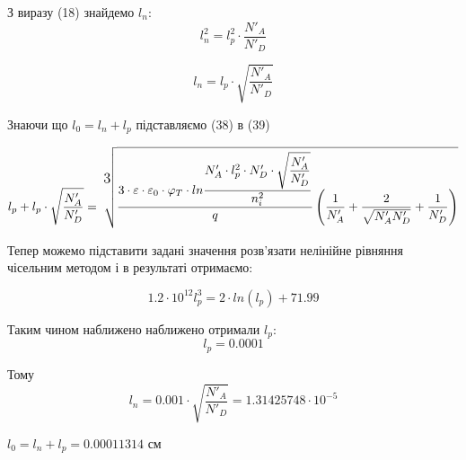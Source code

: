 \documentclass[14pt,a4paper]{scrartcl}
\begin{document}
З виразу (18) знайдемо $l_n$:
\begin{equation}
l^2_n=l^2_p\cdot\dfrac{N'_A}{N'_D}
\end{equation}

\begin{equation}
l_n=l_p\cdot\sqrt{\dfrac{N'_A}{N'_D}}
\end{equation}

Знаючи що $l_0=l_n+l_p$ підставляємо (38) в (39)
\begin{small}
\begin{equation}
l_p+l_p\cdot\sqrt{\dfrac{N'_A}{N'_D}}
= \sqrt[\text{\large{3}}] {\dfrac{3\cdot \varepsilon\cdot \varepsilon_0\cdot \varphi_T\cdot ln\dfrac{N'_A\cdot l^2_p\cdot  N'_D\cdot\sqrt{\dfrac{N'_A}{N'_D}}}{n_i^2}}{q} \left(\dfrac{1}{N'_A}+ \dfrac{2}{\sqrt{N'_A N'_D}}+\dfrac{1}{N'_D}\right)}
\label{eq:ref}
\end{equation}
\end{small}

Тепер можемо підставити задані значення розв'язати  нелінійне рівняння чісельним методом і в результаті отримаємо:

\begin{equation}
1.2\cdot10^{12}l^3_p = 2\cdot ln(l_p) + 71.99 
\label{eq:ref}
\end{equation}

Таким чином наближено наближено отримали $l_p$:
\begin{equation}
l_p= 0.0001
\label{eq:ref}
\end{equation}

Тому 
\begin{equation}
l_n= 0.001\cdot\sqrt{\dfrac{N'_A}{N'_D}}= 1.31425748\cdot 10^{-5}
\label{eq:ref}
\end{equation}


\begin{center}
\vspace{0.3cm}
$l_0=l_n+l_p=0.00011314$ см
\end{center}
\end{document}
